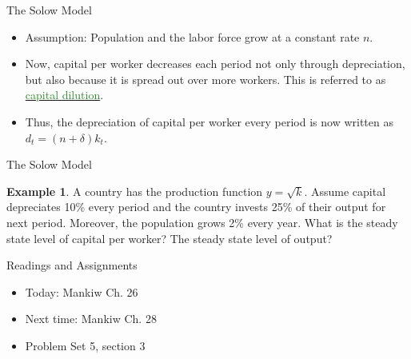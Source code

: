 \documentclass[xcolor={dvipsnames},pdf, hyperref={colorlinks=true, citecolor=ForestGreen, linkcolor=BlueViolet, urlcolor=Magenta}]{beamer}
\theoremstyle{definition}
\newtheorem{exmp}{Example}[section]
\newcommand{\dd}[1]{{\underline{\textcolor{ForestGreen}{#1}}}}
\begin{document}
\begin{frame}{The Solow Model}
\begin{itemize}
	\item Assumption: Population and the labor force grow at a constant rate $n$. 
	\item Now, capital per worker decreases each period not only through depreciation, but also because it is spread out over more workers. This is referred to as \dd{capital dilution}. 
	\item Thus, the depreciation of capital per worker every period is now written as $d_t = (n + \delta)k_t$.
\end{itemize}
\end{frame}

\begin{frame}{The Solow Model}
\begin{exmp} 
	A country has the production function $y = \sqrt{k}$. Assume capital depreciates 10\% every period and the country invests 25\% of their output for next period. Moreover, the population grows 2\% every year. What is the steady state level of capital per worker? The steady state level of output?
\end{exmp}

\end{frame}

\begin{frame}{Readings and Assignments}
\begin{itemize}
	\item Today: Mankiw Ch. 26
	\item Next time: Mankiw Ch. 28
	\item Problem Set 5, section 3
\end{itemize}
\end{frame}
\end{document}
